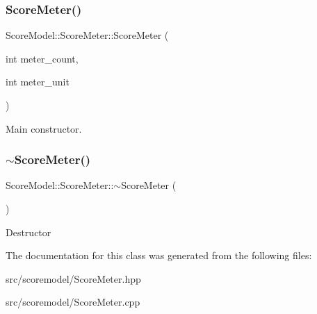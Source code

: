 \subsubsection{\texorpdfstring{ScoreMeter()}{ScoreMeter()}}
{\footnotesize\ttfamily Score\+Model\+::\+Score\+Meter\+::\+Score\+Meter (\begin{DoxyParamCaption}\item[{int}]{meter\+\_\+count,  }\item[{int}]{meter\+\_\+unit }\end{DoxyParamCaption})\hspace{0.3cm}{\ttfamily [inline]}}

Main constructor. \mbox{\label{classScoreModel_1_1ScoreMeter_a9ed75a55cff4e108711488da45ea8f97}} 
\subsubsection{\texorpdfstring{$\sim$ScoreMeter()}{~ScoreMeter()}}
{\footnotesize\ttfamily Score\+Model\+::\+Score\+Meter\+::$\sim$\+Score\+Meter (\begin{DoxyParamCaption}{ }\end{DoxyParamCaption})\hspace{0.3cm}{\ttfamily [inline]}}

Destructor 

The documentation for this class was generated from the following files\+:\begin{DoxyCompactItemize}
\item 
src/scoremodel/Score\+Meter.\+hpp\item 
src/scoremodel/Score\+Meter.\+cpp\end{DoxyCompactItemize}

